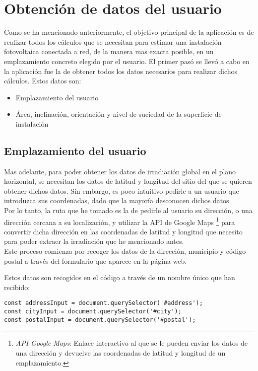 \section{Obtención de datos del usuario}
Como se ha mencionado anteriormente, el objetivo principal de la aplicación es de realizar todos los cálculos que se necesitan para estimar una instalación fotovoltaica conectada a red, de la manera mas exacta posible,  en un emplazamiento concreto elegido por el usuario. El primer pasó se llevó a cabo en la aplicación fue la de obtener todos los datos necesarios para realizar dichos cálculos.
Estos datos son:
\begin{itemize}
\item Emplazamiento del usuario
\item Área, inclinación, orientación y nivel de suciedad de la superficie de instalación
\end{itemize}

\subsection{Emplazamiento del usuario}
Mas adelante, para poder obtener los datos de irradiación global en el plano horizontal, se necesitan los datos de latitud y longitud del sitio del que se quieren obtener dichos datos. Sin embargo, es poco intuitivo pedirle a un usuario que introduzca sus coordenadas, dado que la mayoría desconocen dichos datos.\\
Por lo tanto, la ruta que he tomado es la de pedirle al usuario su dirección, o una dirección cercana a su localización, y utilizar la API de Google Maps \footnote{\textit{API Google Maps}: Enlace interactivo al que se le pueden enviar los datos de una dirección y devuelve las coordenadas de latitud y longitud de un emplazamiento.  } para convertir dicha dirección en las coordenadas de latitud y longitud que necesito para poder extraer la irradiación que he mencionado antes.\\

Este proceso comienza por recoger los datos de la dirección, municipio y código postal a través del formulario que aparece en la página web.

Estos datos son recogidos en el código a través de un nombre único que han recibido:\\
\begin{lstlisting}[style=ES6, caption={Variables correspondientes a los tres campos}]
const addressInput = document.querySelector('#address');
const cityInput = document.querySelector('#city');
const postalInput = document.querySelector('#postal');
\end{lstlisting}

